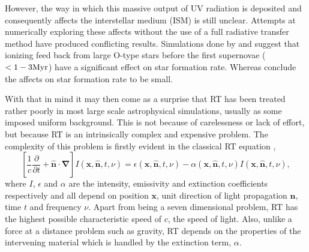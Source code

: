 \documentclass[fleq,usenatbib]{mnras}
\begin{document}
However, the way in which this massive output of UV radiation is deposited 
and consequently affects the interstellar medium (ISM) is still unclear. 
Attempts at numerically exploring these affects without the use of a full 
radiative transfer method have produced conflicting results. Simulations done
by \cite{gritschnederEt09} and \citep{walchEt12} suggest that ionizing feed 
back from large O-type stars before the first supernovae ($<1-3\rm{Myr}$) have 
a significant effect on star formation rate. Whereas \cite{daleEt12} 
conclude the affects on star formation rate to be small.

With that in mind it may then come as a surprise that RT has been treated 
rather poorly in most large scale astrophysical simulations, usually as some 
imposed uniform background. This is not because of carelessness or lack of 
effort, but because RT is an intrinsically complex and expensive problem. 
The complexity of this problem is firstly evident in the classical RT equation 
\citep[e.g.][]{mihalasMihalas84},
\begin{equation} \label{eqn:classicrt}
\left[ \frac{1}{c} \frac{\partial}{\partial t} + \mathbf{\hat{n} \cdot \nabla}
 \right] I\left(\mathbf{x}, \mathbf{\hat{n}}, t, \nu\right) = 
\epsilon\left(\mathbf{x}, \mathbf{\hat{n}}, t, \nu\right) - 
\alpha\left(\mathbf{x}, \mathbf{\hat{n}}, t, \nu\right) 
I\left(\mathbf{x}, \mathbf{\hat{n}}, t, \nu\right),
\end{equation} 
where $I$, $\epsilon$ and $\alpha$ are the intensity, emissivity and 
extinction coefficients respectively and all depend on position $\mathbf{x}$, 
unit direction of light propagation $\mathbf{\hat{n}}$, time $t$ and frequency 
$\nu$. Apart from being a seven dimensional problem, RT has the highest 
possible characteristic speed of $c$, the speed of light. Also, unlike a force 
at a distance problem such as gravity, RT depends on the properties of the 
intervening material which is handled by the extinction term, $\alpha$.
\end{document}
